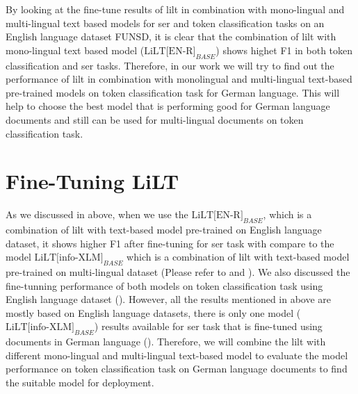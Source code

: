 By looking at the fine-tune results of \acrshort{lilt} in combination with mono-lingual and multi-lingual text based models for \acrshort{ser} and token classification tasks on an English language dataset FUNSD, it is clear that the combination of \acrshort{lilt} with mono-lingual text based model (\(\text{LiLT[EN-R]}_{BASE}\)) shows highet F1 in both token classification and \acrshort{ser} tasks. Therefore, in our work we will try to find out the performance of \acrshort{lilt} in combination with monolingual and multi-lingual text-based pre-trained models on token classification task for German language. This will help to choose the best model that is performing good for German language documents and still can be used for multi-lingual documents on token classification task.    








\section{Fine-Tuning LiLT}

As we discussed in above, when we use the \(\text{LiLT[EN-R]}_{BASE}\), which is a combination of \acrshort{lilt} with text-based model pre-trained on English language dataset, it shows higher F1 after fine-tuning for \acrfull{ser} task with compare to the model \(\text{LiLT[info-XLM]}_{BASE}\) which is a combination of \acrshort{lilt} with text-based model pre-trained on multi-lingual dataset (Please refer to  and ). We also discussed the fine-tunning performance of both models on token classification task using English language dataset (). However, all the results mentioned in above are mostly based on English language datasets, there is only one model (\(\text{LiLT[info-XLM]}_{BASE}\)) results available for \acrshort{ser} task that is fine-tuned using documents in German language (). Therefore, we will combine the \acrshort{lilt} with different mono-lingual and multi-lingual text-based model to evaluate the model performance on token classification task on German language documents to find the suitable model for deployment. 


